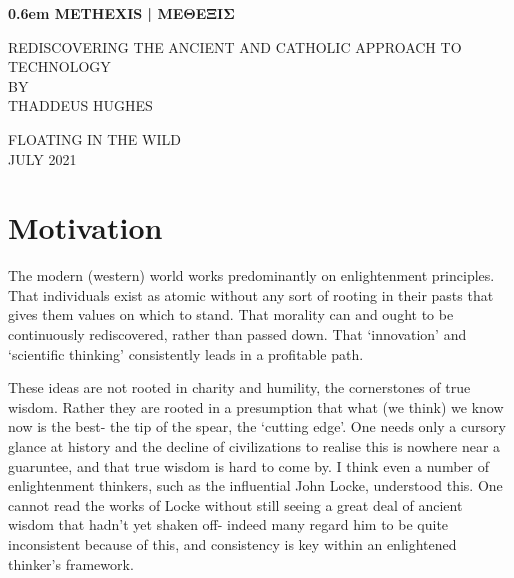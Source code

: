\documentclass[letterpaper]{article}
\begin{document}
\clearpage
\newcommand\nbvspace[1][3]{\vspace*{\stretch{#1}}}
\newcommand\nbstretchyspace{\spaceskip0.5em plus 0.25em minus 0.25em}
\newcommand{\nbtitlestretch}{\spaceskip0.6em}
\pagestyle{plain}
\begin{center}
  \bfseries
  \nbvspace[1]
  \Huge
  {\nbtitlestretch\huge
    METHEXIS | ΜΕΘΕΞΙΣ}

  \nbvspace[1]
  \normalsize
  REDISCOVERING THE ANCIENT AND CATHOLIC APPROACH TO TECHNOLOGY\\

  \nbvspace[1]
  \small BY\\
  \Large THADDEUS HUGHES\\

  \nbvspace[2]

  \nbvspace[3]
  \normalsize

  \large
  FLOATING IN THE WILD \\
  \small JULY 2021 \\
\end{center}

\raggedbottom
\tableofcontents

\section{Motivation}

The modern (western) world works predominantly on enlightenment principles. That individuals exist as atomic without any sort of rooting in their pasts that gives them values on which to stand. That morality can and ought to be continuously rediscovered, rather than passed down. That `innovation' and `scientific thinking' consistently leads in a profitable path.

These ideas are not rooted in charity and humility, the cornerstones of true wisdom. Rather they are rooted in a presumption that what (we think) we know now is the best- the tip of the spear, the `cutting edge'. One needs only a cursory glance at history and the decline of civilizations to realise this is nowhere near a guaruntee, and that true wisdom is hard to come by. I think even a number of enlightenment thinkers, such as the influential John Locke, understood this. One cannot read the works of Locke without still seeing a great deal of ancient wisdom that hadn't yet shaken off- indeed many regard him to be quite inconsistent because of this, and consistency is key within an enlightened thinker's framework.
\end{document}
